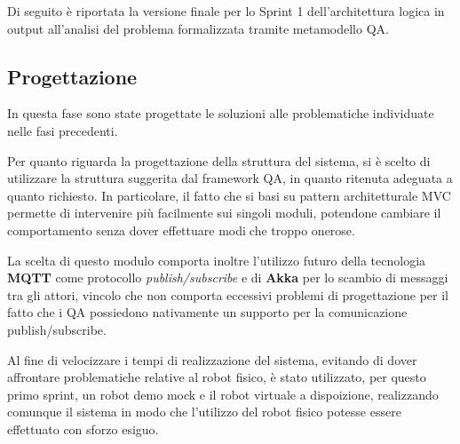 Di seguito è riportata la versione finale per lo Sprint 1 dell'architettura logica in output all'analisi del problema formalizzata tramite metamodello QA\@.



\subsection{Progettazione}

In questa fase sono state progettate le soluzioni alle problematiche individuate nelle fasi precedenti.

Per quanto riguarda la progettazione della struttura del sistema, si è scelto di utilizzare la struttura suggerita dal framework QA, in quanto ritenuta adeguata a quanto richiesto.
In particolare, il fatto che si basi su pattern architetturale MVC permette di intervenire più facilmente sui singoli moduli, potendone cambiare il comportamento senza dover effettuare modiche troppo onerose.

La scelta di questo modulo comporta inoltre l'utilizzo futuro della tecnologia \textbf{MQTT} come protocollo \textit{publish/subscribe} e di \textbf{Akka} per lo scambio di messaggi tra gli attori,
vincolo che non comporta eccessivi problemi di progettazione per il fatto che i QA possiedono nativamente un supporto per la comunicazione publish/subscribe.

Al fine di velocizzare i tempi di realizzazione del sistema, evitando di dover affrontare problematiche relative al robot fisico,
è stato utilizzato, per questo primo sprint, un robot demo mock e il robot virtuale a dispoizione, realizzando comunque il sistema in modo che l'utilizzo del robot fisico potesse essere effettuato con sforzo esiguo.
